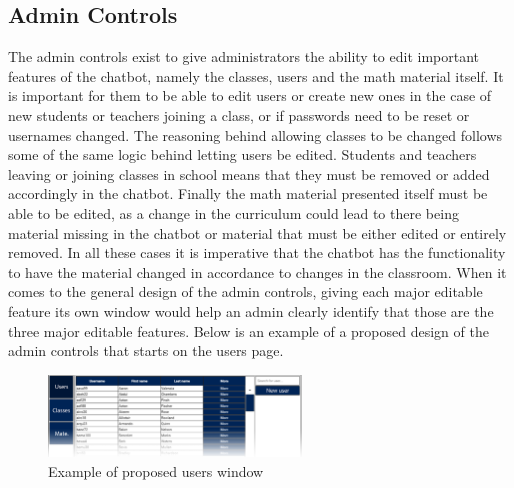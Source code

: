\subsection{Admin Controls} \label{subsec_admin_controls}
The admin controls exist to give administrators the ability to edit  important features of the chatbot, namely the classes, users and the math material itself.\newline\newline
It is important for them to be able to edit users or create new ones in the case of new students or teachers joining a class, or if passwords need to be reset or usernames changed. The reasoning behind allowing classes to be changed follows some of the same logic behind letting users be edited. Students and teachers leaving or joining classes in school means that they must be removed or added accordingly in the chatbot. Finally the math material presented itself must be able to be edited, as a change in the curriculum could lead to there being material missing in the chatbot or material that must be either edited or entirely removed. In all these cases it is imperative that the chatbot has the functionality to have the material changed in accordance to changes in the classroom.
\newline\newline
When it comes to the general design of the admin controls, giving each major editable feature its own window would help an admin clearly identify that those are the three major editable features. Below is an example of a proposed design of the admin controls that starts on the users page.

\begin{figure}[H]
    \centering
    \includegraphics[width=0.6\textwidth]{figures/AdminControls.png}
    \caption{Example of proposed users window}
    \label{fig:user_interface}
\end{figure}

